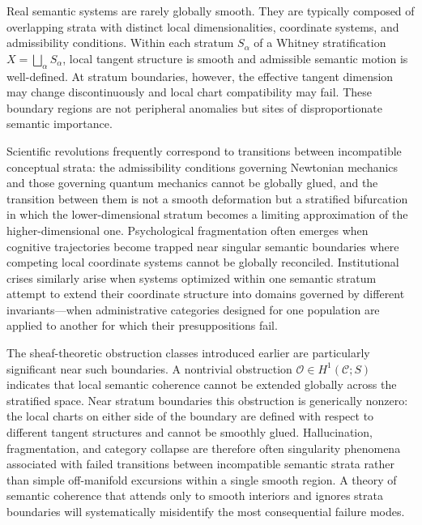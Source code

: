\documentclass[11pt,a4paper,twocolumn]{article}
\begin{document}
Real semantic systems are rarely globally smooth. They are typically
composed of overlapping strata with distinct local dimensionalities,
coordinate systems, and admissibility conditions. Within each stratum
$S_\alpha$ of a Whitney stratification $X = \bigsqcup_\alpha S_\alpha$,
local tangent structure is smooth and admissible semantic motion is
well-defined. At stratum boundaries, however, the effective tangent
dimension may change discontinuously and local chart compatibility may
fail. These boundary regions are not peripheral anomalies but sites of
disproportionate semantic importance.

Scientific revolutions frequently correspond to transitions between
incompatible conceptual strata: the admissibility conditions governing
Newtonian mechanics and those governing quantum mechanics cannot be
globally glued, and the transition between them is not a smooth
deformation but a stratified bifurcation in which the lower-dimensional
stratum becomes a limiting approximation of the higher-dimensional one.
Psychological fragmentation often emerges when cognitive trajectories
become trapped near singular semantic boundaries where competing local
coordinate systems cannot be globally reconciled. Institutional crises
similarly arise when systems optimized within one semantic stratum
attempt to extend their coordinate structure into domains governed by
different invariants---when administrative categories designed for one
population are applied to another for which their presuppositions fail.

The sheaf-theoretic obstruction classes introduced earlier are
particularly significant near such boundaries. A nontrivial obstruction
$\mathcal{O} \in H^1(\mathcal{C}; S)$ indicates that local semantic
coherence cannot be extended globally across the stratified space. Near
stratum boundaries this obstruction is generically nonzero: the local
charts on either side of the boundary are defined with respect to
different tangent structures and cannot be smoothly glued. Hallucination,
fragmentation, and category collapse are therefore often singularity
phenomena associated with failed transitions between incompatible
semantic strata rather than simple off-manifold excursions within a
single smooth region. A theory of semantic coherence that attends only
to smooth interiors and ignores strata boundaries will systematically
misidentify the most consequential failure modes.

\end{document}
